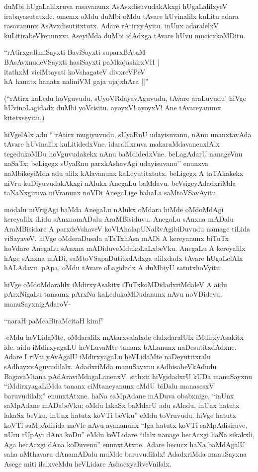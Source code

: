 duMbi hUgaLalilxruva rasavanunx AsAvxdisuvudakAkxgi hUgaLalilxyeV irabayasutatxde. omemx oMdu duMbi oMdu tAvare hUvinalilx kuLitu adara rasavanunx AsAvxdisutitxtutx. Adare rAtirxyAyitu. inUnx adaralelxV kuLitirabeVkenunxva AseyiMda duMbi idAdxga tAvare hUvu mucicxkoMDitu.

\begin{shloka}
``rAtirxgaRmiSayxti BaviSayxti suparxBAtaM\\
BAsAvxnudeVSayxti hasiSayxti paMkajashirxVH‌ |\\
itathxM viciMtayati koVshagateV divxreVPeV\\
hA hanatx hanatx naliniVM gaja ujajxhAra ||''
\end{shloka}

(``rAtirx kaLedu hoVguvudu, sUyoVRdayavAguvudu, tAvare araLuvudu' hiVge hUvinoLagidadx duMbi yoVcisitu. ayoyxV! ayoyxV! Ane tAvareyanunx kitetxseyitu.)

hiVgelAlx adu ```rAtirx mugiyuvudu, sUyaRnU udayisuvanu, nAnu unanxtavAda tAvare hUvinalilx kuLitidedxVne. idaralilxruva makaraMdavanenxlAlx tegedukoMDu hoVguvudakekx nAnu baMdidedxVne. beLagAdarU nanageVnu naSaTx; beLigegx sUyaRnu parxkAshavAgi udayisuvanu'' enunxva naMbikeyiMda adu alilx kAlavanunx kaLeyutitxtutx. beLigegx A taTAkakekx niVru kuDiyuvudakAkxgi nAlukx AnegaLu baMdavu. beVsigeyAdadxriMda taNaNxgiruva niVranunx noVDi AnegaLige bahaLa saMtoVSavAyitu.

modalu niVrigAgi baMda AnegaLu nAlukx oMdara hiMde oMdoMdAgi kereyalilx iLidu sAnxnamADalu AraMBisiduvu. AnegaLu sAnxna mADalu AraMBisidare A parxdeVshaveV koVlAhalapUNaRvAgibiDuvudu namage tiLida viSayaveV. hiVge oMderaDusala aTaTxhAsa mADi A kereyanunx biTuTx hoVdare AnegaLu sAnxna mADiduveMdukoLaLxbeVku. AnegaLu A kereyalilx hAge sAnxna mADi, saMtoVSapaDutitxdAdxga alilxdadx tAvare hUgaLelAlx hALAdavu. pApa, oMdu tAvare oLagidadx A duMbiyU satutxhoVyitu.

hiVge oMdoMdaralilx iMdirxyAsakitx iTuTxkoMDidadxriMdaleV A aidu pArxNigaLu tamamx pArxNa kaLedukoMDudanunx nAvu noVDidevu, manuSayxnigAdaroV-

\begin{shloka}
``naraH paMcaBiraMcitaH kimf''
\end{shloka}

-eMdu heVLidaMte, oMdaralilx mAtarxvalalxde elalxdaralUlx iMdirxyAsakitx ide. aidu iMdirxyagaLU heVLuvaMte tananx bALanunx naDesutitxdAdxne. Adare I riVti yAvAgalU iMdirxyagaLu heVLidaMte naDeyutitxralu sAdhayxvAguvudilalx. AdadxriMda manuSayxnu sAdhisabeVkAdudu BagavaMtana pAdAraviMdagaLanenxV. sithxti hiVgidadxrU kUDa manuSayxnu ``iMdirxyagaLiMda tananx ciMtaneyanunx eMdU biDalu manasesxV baruvudilalx'' enunxtAtxne. haNa saMpAdane mADuva obabxnige, ``inUnx saMpAdane mADabeVku; oMdu lakaSx baMdarU adu sAladu, inUnx hatutx lakaSx beVku, inUnx hatutx koVTi beVku'' eMdu toVruvudu. hiVge hatutx koVTi saMpAdisida meVle nAvu avananunx ``Iga hatutx koVTi saMpAdisiruve, nUru rUpAyi dAna koDu'' eMdu keVLidare ``ilalx nanage hecAcxgi haNa sikakxli, Aga hecAcxgi dAna koDuvenu'' enunxtAtxne. Adare hecucx haNa baMdAgalU saha aMthavaru dAnamADalu muMde baruvudilalx! AdadxriMda manuSayxna Asege miti ilalxveMdu heVLidare AshacxyaRveVnilalx.

